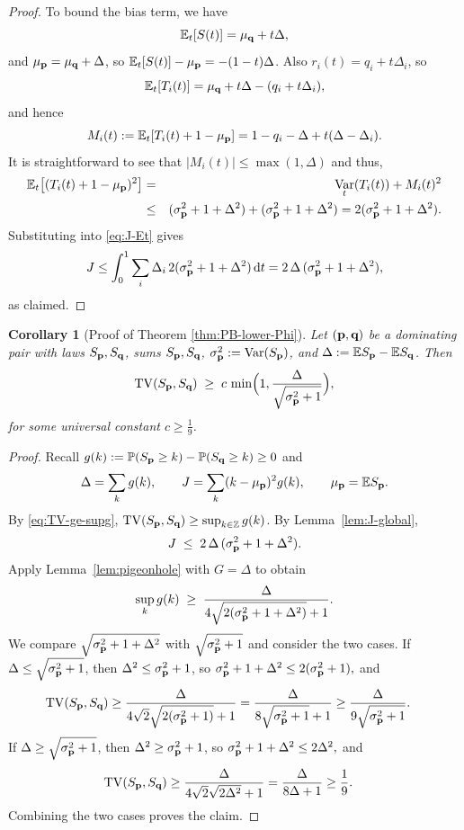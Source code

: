 \documentclass[11pt]{amsart}
\theoremstyle{plain}
\newtheorem{corollary}[theorem]{Corollary}
\theoremstyle{definition}
\DeclareMathOperator{\TV}{TV}
\DeclareMathOperator{\Var}{Var}
\newcommand{\E}{\mathbb{E}}
\renewcommand{\P}{\mathbb{P}}
\newcommand{\beq}{\begin{eqnarray*}}
\newcommand{\eeq}{\end{eqnarray*}}
\newcommand{\mypoi}[1]{S_{#1}}
\renewcommand{\vec}[1]{\textup{{\bf #1}}}
\begin{document}
\begin{proof}
To bound the bias term, we have
\[
  \E_t[S(t)] = \mu_{\vec{q}} + t\Delta,
\]
and $\mu_{\vec{p}}=\mu_{\vec{q}}+\Delta$, so $\E_t[S(t)]-\mu_{\vec{p}}=-(1-t)\Delta$.
Also $r_i(t)=q_i+t\Delta_i$, so
\[
  \E_t[T_i(t)]
  = \mu_{\vec{q}} + t\Delta - (q_i + t\Delta_i),
\]
and hence
\[
  M_i(t) := \E_t[T_i(t)+1-\mu_{\vec{p}}]
  = 1 - q_i - \Delta + t(\Delta-\Delta_i).
\]
It is straightforward to see that
$|M_i(t)| \le \max(1,\Delta)$
and thus,
\beq
  \E_t\bigl[(T_i(t)+1-\mu_{\vec{p}})^2\bigr]
  &=& \Var_t(T_i(t)) + M_i(t)^2
  \\
  &\le&
 (\sigma_{\vec{p}}^2+1+\Delta^2) + (\sigma_{\vec{p}}^2+1+\Delta^2)
  = 2(\sigma_{\vec{p}}^2+1+\Delta^2).
\eeq
Substituting into \eqref{eq:J-Et} gives
\[
  J
  \le \int_0^1 \sum_i \Delta_i\,
         2(\sigma_{\vec{p}}^2+1+\Delta^2)\,\mathrm{d}t
  = 2\,\Delta\,(\sigma_{\vec{p}}^2+1+\Delta^2),
\]
as claimed.
\end{proof}

\begin{corollary}
[Proof of Theorem \ref{thm:PB-lower-Phi}]
\label{cor:PB-global}
Let $(\vec{p},\vec{q})$ be a dominating pair with
laws $\mypoi{\vec{p}},\mypoi{\vec{q}}$,
sums $S_{\vec{p}},S_{\vec{q}}$, $\sigma_{\vec{p}}^2 := \Var(S_{\vec{p}})$,
and
$
  \Delta := \E S_{\vec{p}}-\E S_{\vec{q}}
$.
Then
\[
  \TV(\mypoi{\vec{p}},\mypoi{\vec{q}})
  \;\ge\;
  c\,
  \min\Bigl(1,\frac{\Delta}{\sqrt{\sigma_{\vec{p}}^2+1}}\Bigr),
\]
for some universal constant $c\ge\frac1{9}$.
\end{corollary}

\begin{proof}
Recall $g(k):=\P(S_{\vec{p}}\ge k)-\P(S_{\vec{q}}\ge k)\ge0$ and
\[
  \Delta = \sum_k g(k),\qquad
  J = \sum_k (k-\mu_{\vec{p}})^2 g(k),
  \qquad \mu_{\vec{p}}=\E S_{\vec{p}}.
\]
By \eqref{eq:TV-ge-supg},
$
  \TV(\mypoi{\vec{p}},\mypoi{\vec{q}})
  \ge \sup_{k\in\mathbb{Z}} g(k)$.
By Lemma~\ref{lem:J-global},
\[
  J \;\le\; 2\,\Delta\,(\sigma_{\vec{p}}^2+1+\Delta^2).
\]
Apply Lemma~\ref{lem:pigeonhole} with $G=\Delta$
to obtain
\[
  \sup_k g(k)
  \;\ge\;
  \frac{\Delta}{4\sqrt{2(\sigma_{\vec{p}}^2+1+\Delta^2)} + 1}.
\]
We compare $\sqrt{\sigma_{\vec{p}}^2+1+\Delta^2}$ with
$\sqrt{\sigma_{\vec{p}}^2+1}$ and consider the two cases.
If
$\Delta \le \sqrt{\sigma_{\vec{p}}^2+1}$,
then $\Delta^2\le\sigma_{\vec{p}}^2+1$, so
$
  \sigma_{\vec{p}}^2+1+\Delta^2 \le 2(\sigma_{\vec{p}}^2+1),
$
and
\begin{align*}
  \TV(\mypoi{\vec{p}},\mypoi{\vec{q}})
  &\ge \frac{\Delta}{4\sqrt{2}\sqrt{2(\sigma_{\vec{p}}^2+1)}+1}
  = \frac{\Delta}{8\sqrt{\sigma_{\vec{p}}^2+1}+1} %
\ge
\frac{\Delta}{9\sqrt{\sigma_{\vec{p}}^2+1}}
  .
\end{align*}
If
$\Delta \ge \sqrt{\sigma_{\vec{p}}^2+1}$,
then $\Delta^2\ge\sigma_{\vec{p}}^2+1$, so
$
  \sigma_{\vec{p}}^2+1+\Delta^2 \le 2\Delta^2,
$
and
\begin{align*}
  \TV(\mypoi{\vec{p}},\mypoi{\vec{q}})
  &\ge \frac{\Delta}{4\sqrt{2}\sqrt{2\Delta^2}+1}
  = \frac{\Delta}{8\Delta+1}
  \ge \frac19
  .
\end{align*}
Combining the two cases proves the claim.
\end{proof}
\end{document}
